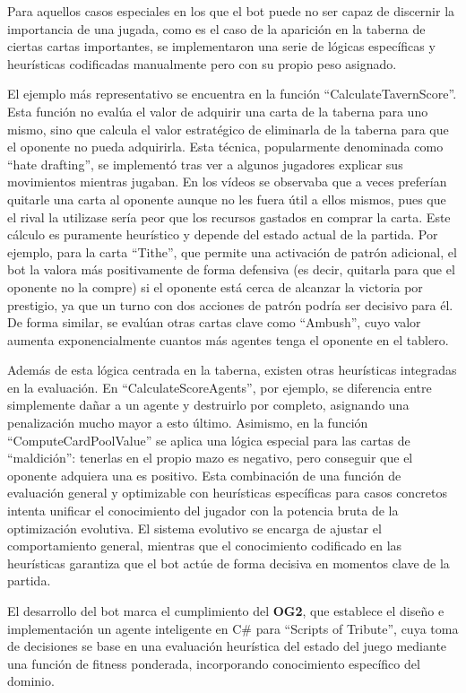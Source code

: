 Para aquellos casos especiales en los que el bot puede no ser capaz de discernir la importancia de una jugada, como es el caso de la aparición en la taberna de ciertas cartas importantes, se implementaron una serie de lógicas específicas y heurísticas codificadas manualmente pero con su propio peso asignado.

El ejemplo más representativo se encuentra en la función ``CalculateTavernScore''. Esta función no evalúa el valor de adquirir una carta de la taberna para uno mismo, sino que calcula el valor estratégico de eliminarla de la taberna para que el oponente no pueda adquirirla. Esta técnica, popularmente denominada como ``hate drafting'', se implementó tras ver a algunos jugadores explicar sus movimientos mientras jugaban. En los vídeos se observaba que a veces preferían quitarle una carta al oponente aunque no les fuera útil a ellos mismos, pues que el rival la utilizase sería peor que los recursos gastados en comprar la carta. Este cálculo es puramente heurístico y depende del estado actual de la partida. Por ejemplo, para la carta ``Tithe'', que permite una activación de patrón adicional, el bot la valora más positivamente de forma defensiva (es decir, quitarla para que el oponente no la compre) si el oponente está cerca de alcanzar la victoria por prestigio, ya que un turno con dos acciones de patrón podría ser decisivo para él. De forma similar, se evalúan otras cartas clave como ``Ambush'', cuyo valor aumenta exponencialmente cuantos más agentes tenga el oponente en el tablero.

Además de esta lógica centrada en la taberna, existen otras heurísticas integradas en la evaluación. En ``CalculateScoreAgents'', por ejemplo, se diferencia entre simplemente dañar a un agente y destruirlo por completo, asignando una penalización mucho mayor a esto último. Asimismo, en la función ``ComputeCardPoolValue'' se aplica una lógica especial para las cartas de ``maldición'': tenerlas en el propio mazo es negativo, pero conseguir que el oponente adquiera una es positivo. Esta combinación de una función de evaluación general y optimizable con heurísticas específicas para casos concretos intenta unificar el conocimiento del jugador con la potencia bruta de la optimización evolutiva. El sistema evolutivo se encarga de ajustar el comportamiento general, mientras que el conocimiento codificado en las heurísticas garantiza que el bot actúe de forma decisiva en momentos clave de la partida.

El desarrollo del bot marca el cumplimiento del \textbf{OG2}, que establece el diseño e implementación un agente inteligente en C\# para ``Scripts of Tribute'', cuya toma de decisiones se base en una evaluación heurística del estado del juego mediante una función de fitness ponderada, incorporando conocimiento específico del dominio.